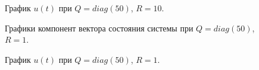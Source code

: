 \begin{figure}[!h]
	\caption{График $u(t)$ при $Q=diag(50)$, $R=10$.}
	\label{6_2_Q_50_R_10_u}
\end{figure}

\begin{figure}[!h]
	\caption{Графики компонент вектора состояния системы при $Q=diag(50)$, $R=1$.}
	\label{6_2_Q_50_R_1_x}
\end{figure}

\begin{figure}[!h]
	\caption{График $u(t)$ при $Q=diag(50)$, $R=1$.}
	\label{6_2_Q_50_R_1_u}
\end{figure}


